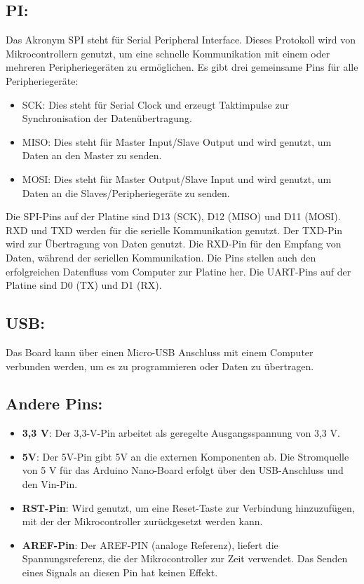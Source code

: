 \subsection{PI:}
Das Akronym SPI steht für Serial Peripheral Interface. Dieses Protokoll wird von Mikrocontrollern genutzt, um eine schnelle Kommunikation mit einem oder mehreren Peripheriegeräten zu ermöglichen. Es gibt drei gemeinsame Pins für alle Peripheriegeräte:
\begin{itemize}
	\item SCK: Dies steht für Serial Clock und erzeugt Taktimpulse zur Synchronisation der Datenübertragung.
	\item MISO: Dies steht für Master Input/Slave Output und wird genutzt, um Daten an den Master zu senden.
	\item MOSI: Dies steht für Master Output/Slave Input und wird genutzt, um Daten an die Slaves/Peripheriegeräte zu senden.
\end{itemize}
Die SPI-Pins auf der Platine sind D13 (SCK), D12 (MISO) und D11 (MOSI). RXD und TXD werden für die serielle Kommunikation genutzt. Der TXD-Pin wird zur Übertragung von Daten genutzt. Die RXD-Pin für den Empfang von Daten, während der seriellen Kommunikation. Die Pins stellen auch den erfolgreichen Datenfluss vom Computer zur Platine her. Die UART-Pins auf der Platine sind D0 (TX) und D1 (RX).
\\
\subsection{USB:}
Das Board kann über einen Micro-USB Anschluss mit einem Computer verbunden werden, um es zu programmieren oder Daten zu übertragen.
\subsection{Andere Pins:}
\begin{itemize}
	\item \textbf{3,3 V}: Der 3,3-V-Pin arbeitet als geregelte Ausgangsspannung von 3,3 V.
	\item \textbf{5V}: Der 5V-Pin gibt 5V an die externen Komponenten ab. Die Stromquelle von 5 V für das Arduino Nano-Board erfolgt über den USB-Anschluss und den Vin-Pin. 
	\item \textbf{RST-Pin}: Wird genutzt, um eine Reset-Taste zur Verbindung hinzuzufügen, mit der der Mikrocontroller zurückgesetzt werden kann.
	\item \textbf{AREF-Pin}: Der AREF-PIN (analoge Referenz), liefert die Spannungsreferenz, die der Mikrocontroller zur Zeit verwendet. Das Senden eines Signals an diesen Pin hat keinen Effekt. 
\end{itemize}
